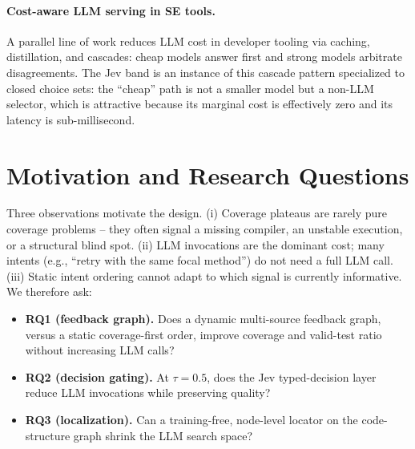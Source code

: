 \documentclass[11pt]{article}
\begin{document}
\paragraph{Cost-aware LLM serving in SE tools.}
A parallel line of work reduces LLM cost in developer tooling via caching, distillation, and cascades: cheap models answer first and strong models arbitrate disagreements. The Jev band is an instance of this cascade pattern specialized to closed choice sets: the ``cheap'' path is not a smaller model but a non-LLM selector, which is attractive because its marginal cost is effectively zero and its latency is sub-millisecond.

\section{Motivation and Research Questions}
Three observations motivate the design. (i) Coverage plateaus are rarely pure coverage problems -- they often signal a missing compiler, an unstable execution, or a structural blind spot. (ii) LLM invocations are the dominant cost; many intents (e.g., ``retry with the same focal method'') do not need a full LLM call. (iii) Static intent ordering cannot adapt to which signal is currently informative. We therefore ask:
\begin{itemize}
  \item \textbf{RQ1 (feedback graph).} Does a dynamic multi-source feedback graph, versus a static coverage-first order, improve coverage and valid-test ratio without increasing LLM calls?
  \item \textbf{RQ2 (decision gating).} At $\tau=0.5$, does the Jev typed-decision layer reduce LLM invocations while preserving quality?
  \item \textbf{RQ3 (localization).} Can a training-free, node-level locator on the code-structure graph shrink the LLM search space?
\end{itemize}
\end{document}
